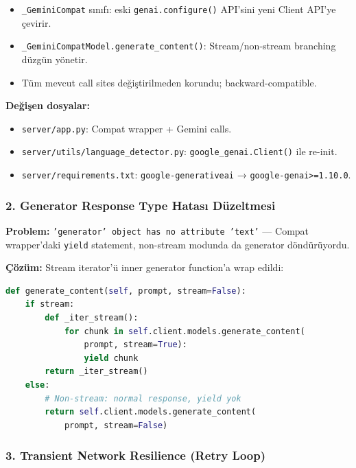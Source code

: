 \documentclass[11pt,a4paper]{article}
\begin{document}
\begin{notebox}
\begin{itemize}[leftmargin=1.2em,nosep]
  \item \texttt{\_GeminiCompat} sınıfı: eski \texttt{genai.configure()} API'sini yeni Client API'ye çevirir.
  \item \texttt{\_GeminiCompatModel.generate\_content()}: Stream/non-stream branching düzgün yönetir.
  \item Tüm mevcut call sites değiştirilmeden korundu; backward-compatible.
\end{itemize}
\end{notebox}

\textbf{Değişen dosyalar:}
\begin{itemize}[leftmargin=1.5em]
  \item \texttt{server/app.py}: Compat wrapper + Gemini calls.
  \item \texttt{server/utils/language\_detector.py}: \texttt{google\_genai.Client()} ile re-init.
  \item \texttt{server/requirements.txt}: \texttt{google-generativeai} → \texttt{google-genai>=1.10.0}.
\end{itemize}

\subsubsection{2. Generator Response Type Hatası Düzeltmesi}

\textbf{Problem:} \texttt{'generator' object has no attribute 'text'} — Compat wrapper'daki \texttt{yield} statement, non-stream modunda da generator döndürüyordu.

\textbf{Çözüm:} Stream iterator'ü inner generator function'a wrap edildi:

\begin{lstlisting}[language=Python, caption={Düzeltilmiş Kod (app.py:80--91)}]
def generate_content(self, prompt, stream=False):
    if stream:
        def _iter_stream():
            for chunk in self.client.models.generate_content(
                prompt, stream=True):
                yield chunk
        return _iter_stream()
    else:
        # Non-stream: normal response, yield yok
        return self.client.models.generate_content(
            prompt, stream=False)
\end{lstlisting}

\subsubsection{3. Transient Network Resilience (Retry Loop)}
\end{document}
